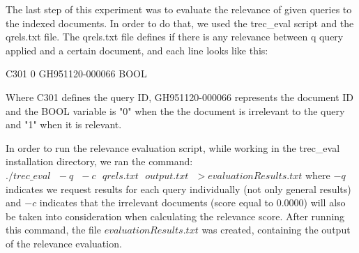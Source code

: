 \documentclass[letterpaper,11pt]{article}
\begin{document}
The last step of this experiment was to evaluate the relevance of given queries to the indexed documents. In order to do that, we used the trec\_eval script  and the qrels.txt file. The qrels.txt file defines if there is any relevance between q query applied and a certain document, and each line looks like this: 

C301 0 GH951120-000066 BOOL


Where C301 defines the query ID, GH951120-000066 represents the document ID and the BOOL variable is "0" when the the document is irrelevant to the query and "1" when it is relevant.

In order to run the relevance evaluation script, while working in the trec\_eval installation directory, we ran the command: $./trec\_eval \text{ } -q \text{ } -c \text{ } qrels.txt \text{ } output.txt \text{ }>evaluationResults.txt$ where $-q$ indicates we request results for each query individually (not only general results) and $-c$ indicates that the irrelevant documents (score equal to 0.0000) will also be taken into consideration when calculating the relevance score. After running this command, the file $evaluationResults.txt$ was created, containing the output of the relevance evaluation.




















    
\end{document}
